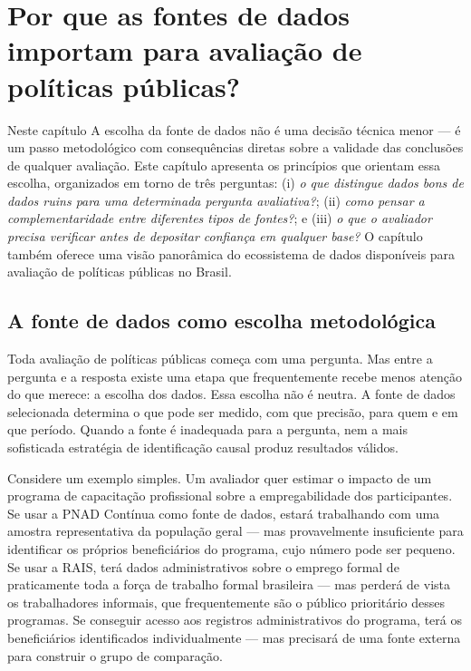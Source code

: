 
\chapter{Por que as fontes de dados importam para avaliação de políticas públicas?}

\begin{boxdestaque}{Neste capítulo}
A escolha da fonte de dados não é uma decisão técnica menor --- é um passo metodológico com consequências diretas sobre a validade das conclusões de qualquer avaliação. Este capítulo apresenta os princípios que orientam essa escolha, organizados em torno de três perguntas: (i) \textit{o que distingue dados bons de dados ruins para uma determinada pergunta avaliativa?}; (ii) \textit{como pensar a complementaridade entre diferentes tipos de fontes?}; e (iii) \textit{o que o avaliador precisa verificar antes de depositar confiança em qualquer base?} O capítulo também oferece uma visão panorâmica do ecossistema de dados disponíveis para avaliação de políticas públicas no Brasil.
\end{boxdestaque}

\section{A fonte de dados como escolha metodológica}

Toda avaliação de políticas públicas começa com uma pergunta. Mas entre a pergunta e a resposta existe uma etapa que frequentemente recebe menos atenção do que merece: a escolha dos dados. Essa escolha não é neutra. A fonte de dados selecionada determina o que pode ser medido, com que precisão, para quem e em que período. Quando a fonte é inadequada para a pergunta, nem a mais sofisticada estratégia de identificação causal produz resultados válidos.

Considere um exemplo simples. Um avaliador quer estimar o impacto de um programa de capacitação profissional sobre a empregabilidade dos participantes. Se usar a PNAD Contínua como fonte de dados, estará trabalhando com uma amostra representativa da população geral --- mas provavelmente insuficiente para identificar os próprios beneficiários do programa, cujo número pode ser pequeno. Se usar a RAIS, terá dados administrativos sobre o emprego formal de praticamente toda a força de trabalho formal brasileira --- mas perderá de vista os trabalhadores informais, que frequentemente são o público prioritário desses programas. Se conseguir acesso aos registros administrativos do programa, terá os beneficiários identificados individualmente --- mas precisará de uma fonte externa para construir o grupo de comparação.

